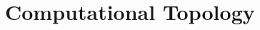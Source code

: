 \chapter{Computational Topology}
\label{ch:computational_topology}


\begingroup
\let\chapter\section



\endgroup
